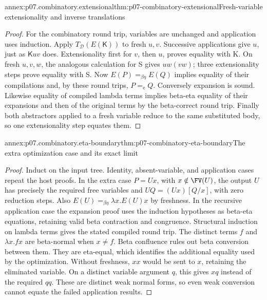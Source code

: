 \begin{annexitem}{annex:p07.combinatory.extensional}{thm:p07-combinatory-extensional}{Fresh-variable extensionality and inverse translations}
\begin{proof}
For the combinatory round trip, variables are unchanged and application uses
induction.  Apply \(T_{\mathcal D}(E(\mathsf K))\) to fresh \(u,v\).
Successive applications give \(u\), just as \(\mathsf Kuv\) does.
Extensionality first for \(v\), then \(u\), proves equality with K.
On fresh \(u,v,w\), the analogous calculation for S gives \(uw(vw)\);
three extensionality steps prove equality with S.
Now \(E(P)=_{\beta\eta}E(Q)\) implies equality of their compilations and,
by these round trips, \(P=_{\mathrm e}Q\).  Conversely expansion is sound.
Likewise equality of compiled lambda terms implies beta-eta equality of their
expansions and then of the original terms by the beta-correct round trip.
Finally both abstractors applied to a fresh variable reduce to the same
substituted body, so one extensionality step equates them.
\end{proof}
\end{annexitem}

\begin{annexitem}{annex:p07.combinatory.eta-boundary}{thm:p07-combinatory-eta-boundary}{The extra optimization case and its exact limit}
\begin{proof}
Induct on the input tree.  Identity, absent-variable, and application cases
repeat the host proofs.  In the extra case \(P=Ux\), with
\(x\notin\FV(U)\), the output \(U\) has precisely the required free variables
and \(UQ=(Ux)[Q/x]\), with zero reduction steps.  Also
\(E(U)=_{\beta\eta}\lambda x.E(U)x\) by freshness.  In the recursive
application case the expansion proof uses the induction hypotheses as
beta-eta equations, retaining valid beta contraction and congruence.  Structural
induction on lambda terms gives the stated compiled round trip.
The distinct terms \(f\) and \(\lambda x.fx\) are beta-normal when \(x\ne f\).
Beta confluence rules out beta conversion between them.  They are eta-equal,
which identifies the additional equality used by the optimization.
Without freshness, \(xx\) would be sent to \(x\), retaining the eliminated
variable.  On a distinct variable argument \(q\), this gives \(xq\) instead
of the required \(qq\).  These are distinct weak normal forms, so even weak
conversion cannot equate the failed application results.
\end{proof}
\end{annexitem}

